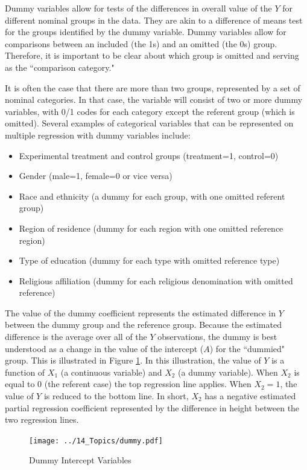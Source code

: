\documentclass[11pt,openany]{book}
\begin{document}
Dummy variables allow for tests of the differences in overall value of the $Y$ for different nominal groups in the data. They are akin to a difference of means test for the groups identified by the dummy variable. Dummy variables allow for comparisons between an included (the 1s) and an omitted (the 0s) group. Therefore, it is important to be clear about which group is omitted and serving as the ``comparison category." 

It is often the case that there are more than two groups, represented by a set of nominal categories. In that case, the variable will consist of two or more dummy variables, with 0/1 codes for each category except the referent group (which is omitted). Several examples of categorical variables that can be represented on multiple regression with dummy variables include:

\begin{itemize}
\item Experimental treatment and control groups (treatment=1, control=0)
\item Gender (male=1, female=0 or vice versa)
\item Race and ethnicity (a dummy for each group, with one omitted referent group)
\item Region of residence (dummy for each region with one omitted reference region)
\item Type of education (dummy for each type with omitted reference type)
\item Religious affiliation (dummy for each religious denomination with omitted reference)
\end{itemize}

The value of the dummy coefficient represents the estimated difference in $Y$ between the dummy group and the reference group. Because the estimated difference is the average over all of the $Y$ observations, the dummy is best understood as a change in the value of the intercept ($A$) for the ``dummied" group. This is illustrated in Figure \ref{fig:dum}. In this illustration, the value of $Y$  is a function of $X_1$ (a continuous variable) and $X_2$ (a dummy variable). When $X_2$ is equal to 0 (the referent case) the top regression line applies. When $X_2 = 1$, the value of $Y$ is reduced to the bottom line. In short, $X_2$ has a negative estimated partial regression coefficient represented by the difference in height between the two regression lines.

\begin{figure}
  \centering
  \texttt{[image: ../14\_Topics/dummy.pdf]}%
  \caption{Dummy Intercept Variables \label{fig:dum}}
\end{figure}
\end{document}
